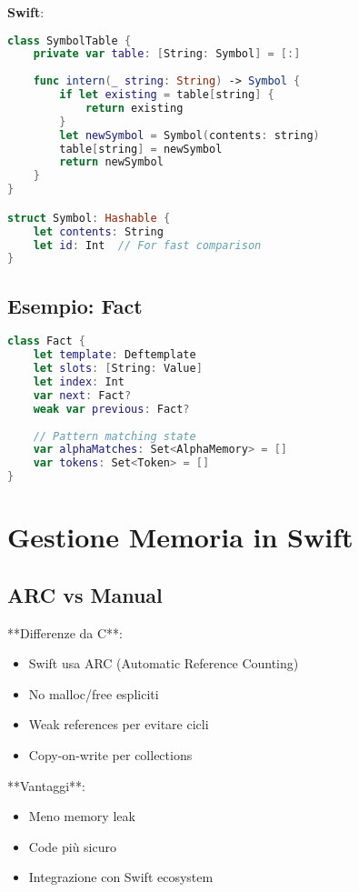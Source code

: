 \textbf{Swift}:
\begin{lstlisting}[language=Swift]
class SymbolTable {
    private var table: [String: Symbol] = [:]
    
    func intern(_ string: String) -> Symbol {
        if let existing = table[string] {
            return existing
        }
        let newSymbol = Symbol(contents: string)
        table[string] = newSymbol
        return newSymbol
    }
}

struct Symbol: Hashable {
    let contents: String
    let id: Int  // For fast comparison
}
\end{lstlisting}

\subsection{Esempio: Fact}

\begin{lstlisting}[language=Swift]
class Fact {
    let template: Deftemplate
    let slots: [String: Value]
    let index: Int
    var next: Fact?
    weak var previous: Fact?
    
    // Pattern matching state
    var alphaMatches: Set<AlphaMemory> = []
    var tokens: Set<Token> = []
}
\end{lstlisting}

\section{Gestione Memoria in Swift}

\subsection{ARC vs Manual}

**Differenze da C**:
\begin{itemize}
\item Swift usa ARC (Automatic Reference Counting)
\item No malloc/free espliciti
\item Weak references per evitare cicli
\item Copy-on-write per collections
\end{itemize}

**Vantaggi**:
\begin{itemize}
\item Meno memory leak
\item Code più sicuro
\item Integrazione con Swift ecosystem
\end{itemize}

